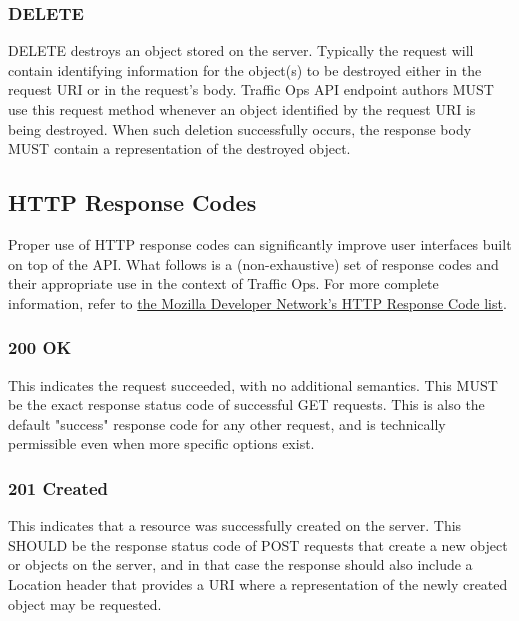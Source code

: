 \subsubsection{DELETE}
DELETE destroys an object stored on the server. Typically the request will contain identifying information for the object(s) to be destroyed either
in the request URI or in the request's body. Traffic Ops API endpoint authors MUST use this request method whenever an object identified by the
request URI is being destroyed. When such deletion successfully occurs, the response body MUST contain a representation of the destroyed object.

\subsection{HTTP Response Codes}
Proper use of HTTP response codes can significantly improve user interfaces built on top of the API. What follows is a (non-exhaustive) set of
response codes and their appropriate use in the context of Traffic Ops. For more complete information, refer to
\href{https://developer.mozilla.org/en-US/docs/Web/HTTP/Status}{the Mozilla Developer Network's HTTP Response Code list}.

\subsubsection{200 OK}
This indicates the request succeeded, with no additional semantics. This MUST be the exact response status code of successful GET requests. This is
also the default "success" response code for any other request, and is technically permissible even when more specific options exist.

\subsubsection{201 Created}
This indicates that a resource was successfully created on the server. This SHOULD be the response status code of POST requests that create a new
object or objects on the server, and in that case the response should also include a Location header that provides a URI where a representation of
the newly created object may be requested.

